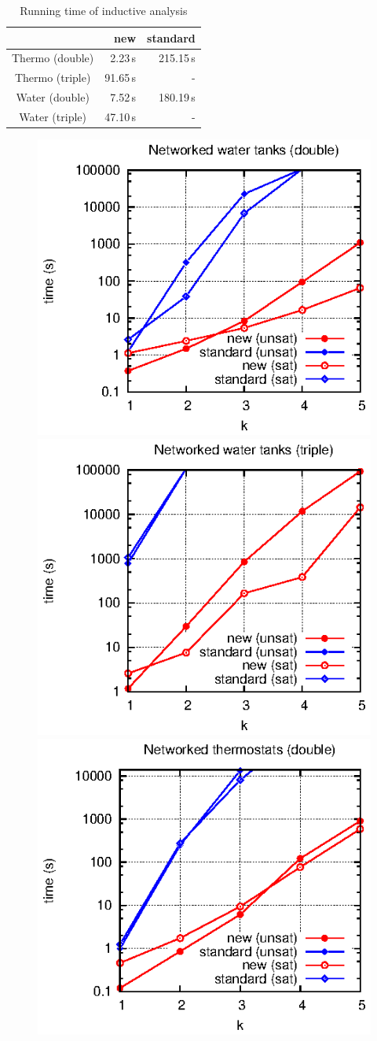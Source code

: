 \begin{table}[b]
\renewcommand{\arraystretch}{1.3}
\caption{Running time of inductive analysis\label{table:inductive}}
\begin{tabular}{crr}
\toprule
				& new	& standard \\
\midrule
Thermo (double)	& 2.23\,s	& 215.15\,s \\
Thermo (triple)		& 91.65\,s & - \\
Water (double)		& 7.52\,s	& 180.19\,s \\
Water (triple)		& 47.10\,s	& - \\
\bottomrule
\end{tabular}
\end{table}


\begin{figure}
\centering
\includegraphics[width=0.45\columnwidth]{plot/water-double.eps}    
\includegraphics[width=0.45\columnwidth]{plot/water-triple.eps}    
\includegraphics[width=0.45\columnwidth]{plot/thermostat-double.eps}    

\end{figure}
